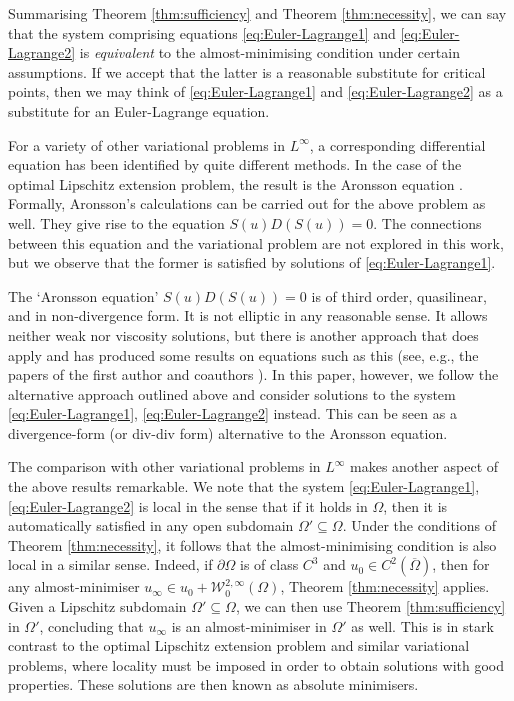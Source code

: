 \documentclass[a4paper]{article}
\newcommand{\W}{\mathcal{W}}
\theoremstyle{remark}
\begin{document}
Summarising Theorem \ref{thm:sufficiency} and Theorem \ref{thm:necessity},
we can say that the system comprising equations \eqref{eq:Euler-Lagrange1}
and \eqref{eq:Euler-Lagrange2} is \emph{equivalent} to the almost-minimising
condition under certain assumptions. If we accept that the latter is a
reasonable substitute for critical points, then we may think of
\eqref{eq:Euler-Lagrange1} and \eqref{eq:Euler-Lagrange2} as a substitute
for an Euler-Lagrange equation.

For a variety of other variational problems in $L^\infty$, a corresponding differential equation
has been identified by quite different methods. In the case of the
optimal Lipschitz extension problem, the result is the Aronsson equation
\cite{Aronsson:68}.
Formally, Aronsson's calculations can be carried out for the above problem
as well. They give rise to the equation $S(u) D(S(u)) = 0$.
The connections between this equation and the variational problem are not explored in this work,
but we observe that the former is satisfied by solutions of \eqref{eq:Euler-Lagrange1}.

The `Aronsson equation' $S(u)D(S(u))=0$ is of third order, quasilinear, and in non-divergence form. It is
not elliptic in any reasonable sense. It allows neither weak nor viscosity solutions, but
there is another approach that does apply and has produced some results on equations such as this
(see, e.g., the papers of the first author and coauthors \cite{Katzourakis:17.2, Croce-Katzourakis-Pisante:17, Katzourakis-Pryer:20}).
In this paper, however, we follow the alternative approach outlined above and consider solutions to the system
\eqref{eq:Euler-Lagrange1}, \eqref{eq:Euler-Lagrange2} instead. This can be seen as a divergence-form
(or div-div form) alternative to the Aronsson equation.

The comparison with other variational problems in $L^\infty$ makes
another aspect of the above results remarkable. We note that the system
\eqref{eq:Euler-Lagrange1}, \eqref{eq:Euler-Lagrange2} is local in the
sense that if it holds in $\Omega$, then it is automatically satisfied
in any open subdomain $\Omega' \subseteq \Omega$. Under the conditions of Theorem \ref{thm:necessity},
it follows that the almost-minimising condition is also local in
a similar sense. Indeed, if $\partial \Omega$ is of class $C^3$ and $u_0 \in C^2(\overline{\Omega})$,
then for any almost-minimiser $u_\infty \in u_0 + \W_0^{2, \infty}(\Omega)$, Theorem \ref{thm:necessity}
applies. Given a Lipschitz subdomain $\Omega' \subseteq \Omega$,
we can then use Theorem \ref{thm:sufficiency} in $\Omega'$,
concluding that $u_\infty$ is an almost-minimiser in $\Omega'$ as well.
This is in stark contrast to the optimal Lipschitz extension
problem and similar variational problems, where locality must be imposed
in order to obtain solutions with good properties. These solutions are
then known as absolute minimisers.
\end{document}
